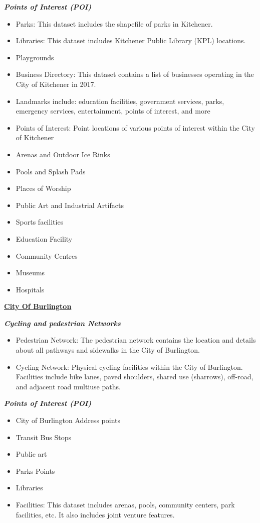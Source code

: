 \documentclass[
11pt, %
oneside, %
english, %
singlespacing, %
]{macthesis} %
\begin{document}
\textbf{\emph{Points of Interest (POI)}}

\begin{itemize}
\item
  Parks: This dataset includes the shapefile of parks in Kitchener.
\item
  Libraries: This dataset includes Kitchener Public Library (KPL) locations.
\item
  Playgrounds
\item
  Business Directory: This dataset contains a list of businesses operating in the City of Kitchener in 2017.
\item
  Landmarks include: education facilities, government services, parks, emergency services, entertainment, points of interest, and more
\item
  Points of Interest: Point locations of various points of interest within the City of Kitchener
\item
  Arenas and Outdoor Ice Rinks
\item
  Pools and Splash Pads
\item
  Places of Worship
\item
  Public Art and Industrial Artifacts
\item
  Sports facilities
\item
  Education Facility
\item
  Community Centres
\item
  Museums
\item
  Hospitals
\end{itemize}

\textbf{\href{https://data.waterloo.ca/search?tags=base\%20data}{City Of Burlington}}

\textbf{\emph{Cycling and pedestrian Networks}}

\begin{itemize}
\item
  Pedestrian Network: The pedestrian network contains the location and details about all pathways and sidewalks in the City of Burlington.
\item
  Cycling Network: Physical cycling facilities within the City of Burlington. Facilities include bike lanes, paved shoulders, shared use (sharrows), off-road, and adjacent road multiuse paths.
\end{itemize}

\textbf{\emph{Points of Interest (POI)}}

\begin{itemize}
\item
  City of Burlington Address points
\item
  Transit Bus Stops
\item
  Public art
\item
  Parks Points
\item
  Libraries
\item
  Facilities: This dataset includes arenas, pools, community centers, park facilities, etc. It also includes joint venture features.
\end{itemize}
\end{document}
